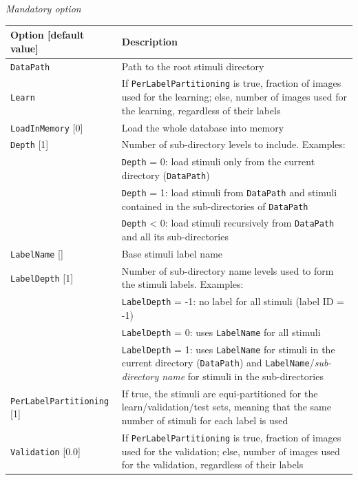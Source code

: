 \documentclass[a4paper,11pt,oneside]{article}
\begin{document}
\emph{Mandatory option}
\begin{center}
 \begin{longtable}{| p{5cm} | p{10cm} | }
 \hline
 Option [default value] & Description\\
 \hline\hline
  \cellcolor{requiredcolor}
  \lstinline!DataPath! & Path to the root stimuli directory \\
  \cellcolor{requiredcolor}
  \lstinline!Learn! & If \lstinline!PerLabelPartitioning! is true, fraction of
  images used for the learning; else, number of images
  used for the learning, regardless of their labels \\
  \lstinline!LoadInMemory! [0] & Load the whole database into memory \\
  \lstinline!Depth! [1] & Number of sub-directory levels to include.
  Examples: \\
    & \lstinline!Depth! = 0: load stimuli only from the current directory (\lstinline!DataPath!) \\
    & \lstinline!Depth! = 1: load stimuli from \lstinline!DataPath! and stimuli
     contained in the sub-directories of \lstinline!DataPath! \\
    & \lstinline!Depth! < 0: load stimuli recursively from \lstinline!DataPath!
    and all its sub-directories \\
  \lstinline!LabelName! [] & Base stimuli label name \\
  \lstinline!LabelDepth! [1] & Number of sub-directory name levels used to form
   the stimuli labels. Examples: \\
    & \lstinline!LabelDepth! = -1: no label for all stimuli (label ID = -1) \\
    & \lstinline!LabelDepth! = 0: uses \lstinline!LabelName! for all stimuli \\
    & \lstinline!LabelDepth! = 1: uses \lstinline!LabelName! for stimuli in the
     current directory (\lstinline!DataPath!) and
     \lstinline!LabelName!/\emph{sub-directory name} for stimuli in the
     sub-directories \\
  \lstinline!PerLabelPartitioning! [1] & If true, the stimuli are
  equi-partitioned for the learn/validation/test sets, meaning that the same
  number of stimuli for each label is used \\
  \lstinline!Validation! [0.0] & If \lstinline!PerLabelPartitioning! is true,
  fraction of images used for the validation; else, number of images used for
  the validation, regardless of their labels \\

\end{longtable}
\end{center}
\end{document}
